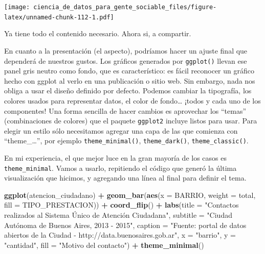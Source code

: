 \documentclass[spanish,]{book}
\newenvironment{Shaded}{\begin{snugshade}}{\end{snugshade}}
\newcommand{\DataTypeTok}[1]{\textcolor[rgb]{0.13,0.29,0.53}{#1}}
\newcommand{\KeywordTok}[1]{\textcolor[rgb]{0.13,0.29,0.53}{\textbf{#1}}}
\newcommand{\NormalTok}[1]{#1}
\newcommand{\OperatorTok}[1]{\textcolor[rgb]{0.81,0.36,0.00}{\textbf{#1}}}
\newcommand{\StringTok}[1]{\textcolor[rgb]{0.31,0.60,0.02}{#1}}
\begin{document}
\texttt{[image: ciencia\_de\_datos\_para\_gente\_sociable\_files/figure-latex/unnamed-chunk-112-1.pdf]}

Ya tiene todo el contenido necesario. Ahora si, a compartir.

En cuanto a la presentación (el aspecto), podríamos hacer un ajuste final que dependerá de nuestros gustos. Los gráficos generados por \texttt{ggplot()} llevan ese panel gris neutro como fondo, que es característico: es fácil reconocer un gráfico hecho con ggplot al verlo en una publicación o sitio web. Sin embargo, nada nos obliga a usar el diseño definido por defecto. Podemos cambiar la tipografía, los colores usados para representar datos, el color de fondo\ldots{} ¡todos y cada uno de los componentes! Una forma sencilla de hacer cambios es aprovechar los ``temas'' (combinaciones de colores) que el paquete \texttt{ggplot2} incluye listos para usar. Para elegir un estilo sólo necesitamos agregar una capa de las que comienza con ``theme\_\ldots{}'', por ejemplo \texttt{theme\_minimal()}, \texttt{theme\_dark()}, \texttt{theme\_classic()}.

En mi experiencia, el que mejor luce en la gran mayoría de los casos es \texttt{theme\_minimal}. Vamos a usarlo, repitiendo el código que generó la última visualización que hicimos, y agregando una línea al final para definir el tema.

\begin{Shaded}
\begin{Highlighting}[]
\KeywordTok{ggplot}\NormalTok{(atencion_ciudadano) }\OperatorTok{+}
\StringTok{    }\KeywordTok{geom_bar}\NormalTok{(}\KeywordTok{aes}\NormalTok{(}\DataTypeTok{x =}\NormalTok{ BARRIO, }\DataTypeTok{weight =}\NormalTok{ total, }\DataTypeTok{fill =}\NormalTok{ TIPO_PRESTACION)) }\OperatorTok{+}
\StringTok{    }\KeywordTok{coord_flip}\NormalTok{() }\OperatorTok{+}
\StringTok{    }\KeywordTok{labs}\NormalTok{(}\DataTypeTok{title =} \StringTok{"Contactos realizados al Sistema Único de Atención Ciudadana"}\NormalTok{,}
         \DataTypeTok{subtitle =} \StringTok{"Ciudad Autónoma de Buenos Aires, 2013 - 2015"}\NormalTok{,}
         \DataTypeTok{caption =} \StringTok{"Fuente: portal de datos abiertos de la Ciudad - http://data.buenosaires.gob.ar"}\NormalTok{,}
         \DataTypeTok{x =} \StringTok{"barrio"}\NormalTok{,}
         \DataTypeTok{y =} \StringTok{"cantidad"}\NormalTok{,}
         \DataTypeTok{fill =} \StringTok{"Motivo del contacto"}\NormalTok{) }\OperatorTok{+}
\StringTok{    }\KeywordTok{theme_minimal}\NormalTok{()}
\end{Highlighting}
\end{Shaded}
\end{document}

